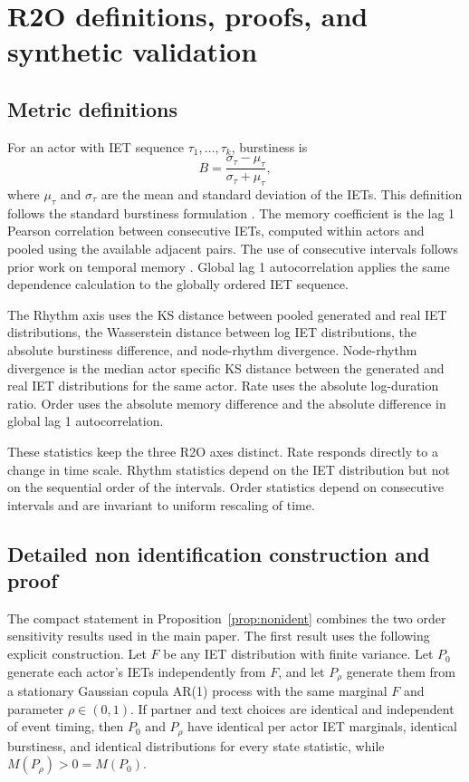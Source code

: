 

\section{R2O definitions, proofs, and synthetic validation}
\label{app:proofs}
\label{app:r2o-definitions}

\subsection{Metric definitions}

For an actor with IET sequence $\tau_1,\ldots,\tau_k$, burstiness is
\[
B=\frac{\sigma_\tau-\mu_\tau}{\sigma_\tau+\mu_\tau},
\]
where $\mu_\tau$ and $\sigma_\tau$ are the mean and standard deviation of the
IETs.
This definition follows the standard burstiness formulation \citep{goh2008burstiness}. The memory coefficient is the lag 1 Pearson correlation between
consecutive IETs, computed within actors and pooled using the available
adjacent pairs. The use of consecutive intervals follows prior work on temporal memory \citep{goh2008burstiness,karsai2012universal}. Global lag 1 autocorrelation applies the same dependence
calculation to the globally ordered IET sequence.

The Rhythm axis uses the KS distance between pooled generated and real IET
distributions, the Wasserstein distance between log IET distributions, the
absolute burstiness difference, and node-rhythm divergence. Node-rhythm
divergence is the median actor specific KS distance between the generated and
real IET distributions for the same actor. Rate uses the absolute log-duration
ratio. Order uses the absolute memory difference and the absolute difference
in global lag 1 autocorrelation.

These statistics keep the three R2O axes distinct. Rate responds directly to a
change in time scale. Rhythm statistics depend on the IET distribution but not
on the sequential order of the intervals. Order statistics depend on
consecutive intervals and are invariant to uniform rescaling of time.

\subsection{Detailed non identification construction and proof}

The compact statement in Proposition~\ref{prop:nonident} combines the two
order sensitivity results used in the main paper. The first result uses the
following explicit construction. Let $F$ be any IET distribution with finite
variance. Let $P_0$ generate each actor's IETs independently from $F$, and let
$P_\rho$ generate them from a stationary Gaussian copula AR(1) process with the
same marginal $F$ and parameter $\rho\in(0,1)$. If partner and text choices are
identical and independent of event timing, then $P_0$ and $P_\rho$ have
identical per actor IET marginals, identical burstiness, and identical
distributions for every state statistic, while $M(P_\rho)>0=M(P_0)$.

